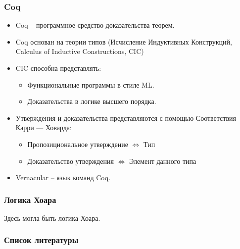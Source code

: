 \documentclass{beamer}
\begin{document}
\begin{frame}
	\frametitle{Coq}
	\begin{itemize}
		\item<2-> Coq -- программное средство доказательства теорем.
		\item<3-> Coq основан на теории типов (Исчисление Индуктивных Конструкций, Calculus of Inductive Constructions, CIC)
		\item<4-> CIC способна представлять:
		      \begin{itemize}
			      \item<5-> Функциональные программы в стиле ML.
			      \item<6-> Доказательства в логике высшего порядка.
		      \end{itemize}
		\item<7-> Утверждения и доказательства представляются с помощью Соответствия Карри — Ховарда:
		      \begin{itemize}
			      \item<8-> Пропозициональное утверждение $\iff$ Тип
			      \item<9-> Доказательство утверждения $\iff$ Элемент данного типа
		      \end{itemize}
		\item<10-> Vernacular -- язык команд Coq.
	\end{itemize}
\end{frame}

\begin{frame}
	\frametitle{Логика Хоара}
	Здесь могла быть логика Хоара. 
\end{frame}

\begin{frame}[allowframebreaks]
	\frametitle{Список литературы}
	\printbibliography
\end{frame}

\end{document}
